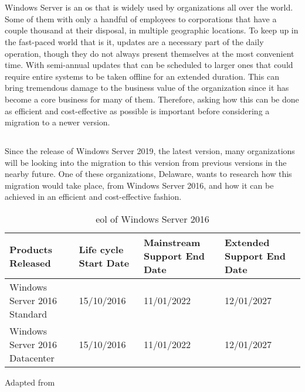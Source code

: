 \chapter{}
\label{ch:inleiding}
Windows Server is an \acrfull{os} that is widely used by organizations all over the world. Some of them with only a handful of employees to corporations that have a couple thousand at their disposal, in multiple geographic locations. To keep up in the fast-paced world that is \acrfull{it}, updates are a necessary part of the daily operation, though they do not always present themselves at the most convenient time. 
With semi-annual updates that can be scheduled to larger ones that could require entire systems to be taken offline for an extended duration. This can bring tremendous damage to the business value of the organization since \acrshort{it} has become a core business for many of them. Therefore, asking how this can be done as efficient and cost-effective as possible is important before considering a migration to a newer version. 

\section{}
\label{sec:probleemstelling}
Since the release of Windows Server 2019, the latest version, many organizations will be looking into the migration to this version from previous versions in the nearby future. One of these organizations, Delaware, wants to research how this migration would take place, from Windows Server 2016, and how it can be achieved in an efficient and cost-effective fashion. 

\begin{table}[ht]
	\centering
	\begin{adjustbox}{width=1\textwidth}
		\begin{tabular}{l|l|l|ll}
			Products Released & Life cycle Start Date & Mainstream Support End Date & Extended Support End Date &\\
			\hline
			Windows Server 2016 Standard & 15/10/2016 & 11/01/2022 & 12/01/2027 &\\
			Windows Server 2016 Datacenter & 15/10/2016 & 11/01/2022 & 12/01/2027 &\\
		\end{tabular}
	\end{adjustbox}
	\caption[\acrshort{eol} \acrshort{ws}2016]{\acrshort{eol} of Windows Server 2016}
	\scriptsize	
	Adapted from \cite{MicrosoftEOL2019}
	\label{tab:EOL2016}
\end{table}

